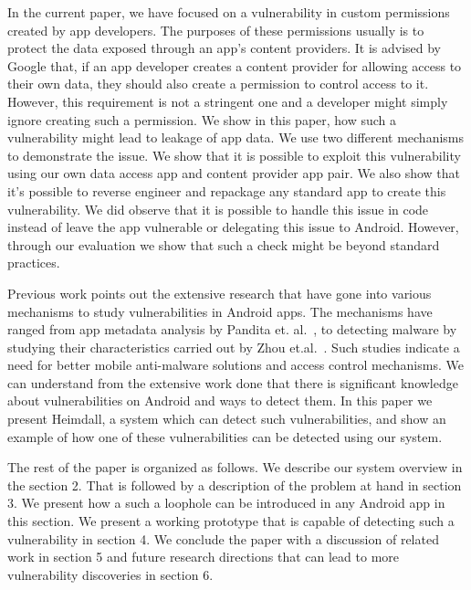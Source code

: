 In the current paper, we have focused on a vulnerability in custom permissions created by app developers. The purposes of these permissions usually is to protect the data exposed through an app's content providers. It is advised by Google that, if an app developer creates a content provider for allowing access to their own data, they should also create a permission to control access to it. However, this requirement is not a stringent one and a developer might simply ignore creating such a permission. We show in this paper, how such a vulnerability might lead to leakage of app data. We use two different mechanisms to demonstrate the issue. We show that it is possible to exploit this vulnerability using our own data access app and content provider app pair. We also show that it's possible to reverse engineer and repackage any standard app to create this vulnerability. We did observe that it is possible to handle this issue in code instead of leave the app vulnerable or delegating this issue to Android. However, through our evaluation we show that such a check might be beyond standard practices. 

Previous work points out the extensive research that have gone into various mechanisms to study vulnerabilities in Android apps. The mechanisms have ranged from app metadata analysis by Pandita et. al.~\cite{Pandita2013Whyper}, to detecting malware by studying their characteristics carried out by Zhou et.al.~\cite{Zhou2012MalwareGenomeProject}. Such studies indicate a need for better mobile anti-malware solutions and access control mechanisms. We can understand from the extensive work done that there is significant knowledge about vulnerabilities on Android and ways to detect them. In this paper we present Heimdall, a system which can detect such vulnerabilities, and show an example of how one of these vulnerabilities can be detected using our system. 

The rest of the paper is organized as follows. We describe our system overview in the section 2. That is followed by a description of the problem at hand in section 3. We present how a such a loophole can be introduced in any Android app in this section. We present a working prototype that is capable of detecting such a vulnerability in section 4. We conclude the paper with a discussion of related work in section 5 and future research directions that can lead to more vulnerability discoveries in section 6.


